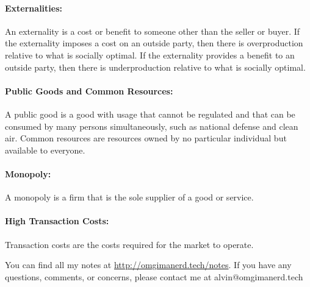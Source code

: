 \documentclass{article}
\begin{document}
\paragraph{Externalities:}
An externality is a cost or benefit to someone other than the seller or buyer.
If the externality imposes a cost on an outside party, then there is
overproduction relative to what is socially optimal. If the externality provides
a benefit to an outside party, then there is underproduction relative to what is
socially optimal.

\paragraph{Public Goods and Common Resources:}
A public good is a good with usage that cannot be regulated and that can be
consumed by many persons simultaneously, such as national defense and clean air.
Common resources are resources owned by no particular individual but available
to everyone.

\paragraph{Monopoly:}
A monopoly is a firm that is the sole supplier of a good or service.

\paragraph{High Transaction Costs:}
Transaction costs are the costs required for the market to operate.

\begin{center}
  You can find all my notes at \url{http://omgimanerd.tech/notes}. If you have
  any questions, comments, or concerns, please contact me at
  alvin@omgimanerd.tech
\end{center}
\end{document}
